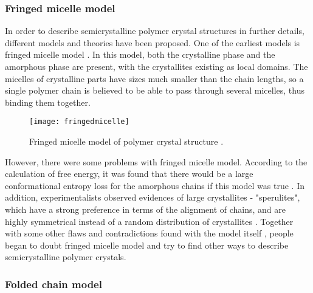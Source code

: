 \subsubsection{Fringed micelle model}

In order to describe semicrystalline polymer crystal structures in further details, different models and theories have been proposed. One of the earliest models is fringed micelle model \cite{HerrmannKGerngrossO1930}. In this model, both the crystalline phase and the amorphous phase are present, with the crystallites existing as local domains. The micelles of crystalline parts have sizes much smaller than the chain lengths, so a single polymer chain is believed to be able to pass through several micelles, thus binding them together.


\begin{figure}[H]
\center
\vspace{1 cm}
\texttt{[image: fringedmicelle]}
\caption[Fringed micelle model of polymer crystal structure.]{Fringed micelle model of polymer crystal structure \cite{Flory1953}.}
\label{fig:fringedmicelle}
\end{figure}

However, there were some problems with fringed micelle model. According to the calculation of free energy, it was found that there would be a large conformational entropy loss for the amorphous chains if this model was true \cite{Flory1962}. In addition, experimentalists observed evidences of large crystallites - "sperulites", which have a strong preference in terms of the alignment of chains, and are highly symmetrical instead of a random distribution of crystallites \cite{Geil1964}. Together with some other flaws and contradictions found with the model itself \cite{Zachmann1967,Zachmann1969}, people began to doubt fringed micelle model and try to find other ways to describe semicrystalline polymer crystals.

\subsubsection{Folded chain model} \label{folded chain model}

